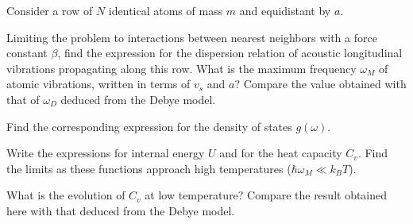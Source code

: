 \begin{problem}
  Consider a row of $N$ identical atoms of mass $m$ and equidistant by $a$.
  \begin{enumext}[label = (\alph*)]
    \item Limiting the problem to interactions between nearest neighbors with a force constant $\beta$, find the expression for the dispersion relation of acoustic longitudinal vibrations propagating along this row. What is the maximum frequency $\omega_M$ of atomic vibrations, written in terms of $v_s$ and $a$? Compare the value obtained with that of $\omega_D$ deduced from the Debye model.
    \item Find the corresponding expression for the density of states $g(\omega)$.
    \item Write the expressions for internal energy $U$ and for the heat capacity $C_v$. Find the limits as these functions approach high temperatures ($\hbar\omega_M \ll k_BT$).
    \item What is the evolution of $C_v$ at low temperature? Compare the result obtained here with that deduced from the Debye model.
  \end{enumext}
\end{problem}
